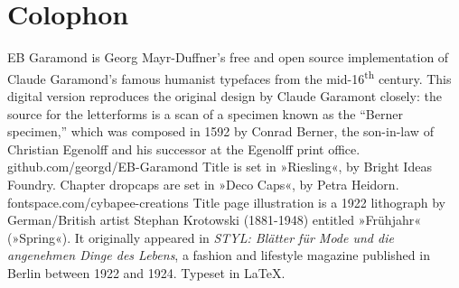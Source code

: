 \documentclass[
a5paper,
BCOR=7mm,
twoside,
DIV=calc,
11pt,
usegeometry,
chapterprefix,
headings=big]{scrbook} %
\begin{document}
\chapter*{Colophon}
\begin{center}
EB Garamond is Georg Mayr-Duffner's free and open source implementation of Claude Garamond’s famous humanist typefaces from the mid-16\textsuperscript{th} century. This digital version reproduces the original design by Claude Garamont closely: the source for the letterforms is a scan of a specimen known as the \enquote{Berner specimen,} which was composed in 1592 by Conrad Berner, the son-in-law of Christian Egenolff and his successor at the Egenolff print office.  \\github.com/georgd/EB-Garamond
\vfill
Title is set in »Riesling«, by Bright Ideas Foundry.
\vfill
Chapter dropcaps are set in »Deco Caps«, by Petra Heidorn.\\fontspace.com/cybapee-creations
\vfill
Title page illustration is a 1922 lithograph by German/British artist Stephan Krotowski (1881-1948) entitled »Frühjahr« (»Spring«). It originally appeared in \textit{STYL: Blätter für Mode und die angenehmen Dinge des Lebens}, a fashion and lifestyle magazine published in Berlin between 1922 and 1924.
\vfill
Typeset in \LaTeX{}.
\end{center}
\thispagestyle{empty}
\end{document}
